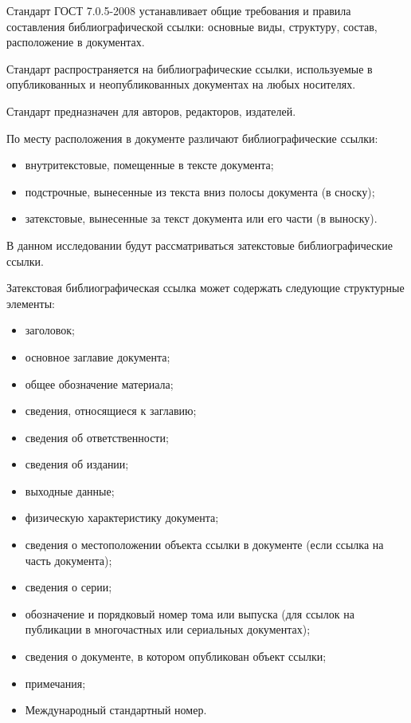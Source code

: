 Стандарт ГОСТ 7.0.5-2008 устанавливает общие требования и правила составления библиографической ссылки: основные виды, структуру, состав, расположение в документах.

Стандарт распространяется на библиографические ссылки, используемые в опубликованных и неопубликованных документах на любых носителях.

Стандарт предназначен для авторов, редакторов, издателей.

По месту расположения в документе различают библиографические ссылки:
\begin{itemize}
	\item внутритекстовые, помещенные в тексте документа;
	\item подстрочные, вынесенные из текста вниз полосы документа (в сноску);
	\item затекстовые, вынесенные за текст документа или его части (в выноску).
\end{itemize}

В данном исследовании будут рассматриваться затекстовые библиографические ссылки.

Затекстовая библиографическая ссылка может содержать следующие структурные элементы:
\begin{itemize}
	\item заголовок;
	\item основное заглавие документа;
	\item общее обозначение материала;
	\item сведения, относящиеся к заглавию;
	\item сведения об ответственности;
	\item сведения об издании;
	\item выходные данные;
	\item физическую характеристику документа;
	\item сведения о местоположении объекта ссылки в документе (если ссылка на часть документа);
	\item сведения о серии;
	\item обозначение и порядковый номер тома или выпуска (для ссылок на публикации в многочастных или сериальных документах);
	\item сведения о документе, в котором опубликован объект ссылки;
	\item примечания;
	\item Международный стандартный номер.
\end{itemize}

